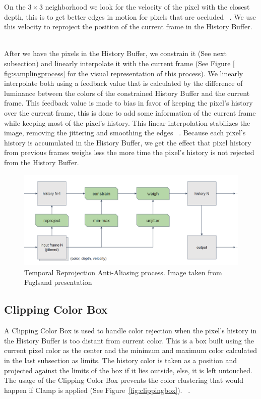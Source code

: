 \documentclass{cslthse-msc}
\begin{document}
On the $3\times 3$ neighborhood we look for the velocity of the pixel with the closest depth, this is to get better edges in motion for pixels that are occluded ~\cite{Fuglsand2016}. We use this velocity to reproject the position of the current frame in the History Buffer. ~\cite{Fuglsand2016,XU2016}

After we have the pixels in the History Buffer, we constrain it (See next subsection) and linearly interpolate it with the current frame (See Figure \ref{ fig:samplingprocess} for the visual representation of this process). We linearly interpolate both using a feedback value that is calculated by the difference of luminance between the colors of the constrained History Buffer and the current frame. This feedback value is made to bias in favor of keeping the pixel’s history over the current frame, this is done to add some information of the current frame while keeping most of the pixel's history. This linear interpolation stabilizes the image, removing the jittering and smoothing the edges ~\cite{Fuglsand2016,XU2016}. Because each pixel's history is accumulated in the History Buffer, we get the effect that pixel history from previous frames weighs less the more time the pixel's history is not rejected from the History Buffer. ~\cite{Fuglsand2016}

\begin{figure}[!hbt]
	\centering
	\includegraphics[scale=0.4]{images/sampling_process.png}
	\caption{Temporal Reprojection Anti-Aliasing process. Image taken from Fuglsand presentation \protect\cite{Fuglsand2016}}\label{fig:samplingprocess}
\end{figure}

\subsection{Clipping Color Box} 
A Clipping Color Box is used to handle color rejection when the pixel's history in the History Buffer is too distant from current color. This is a box built using the current pixel color as the center and the minimum and maximum color calculated in the last subsection as limits. The history color is taken as a position and projected against the limits of the box if it lies outside, else, it is left untouched. The usage of the Clipping Color Box prevents the color clustering that would happen if Clamp is applied (See Figure~\ref{fig:clippingbox}). ~\cite{Fuglsand2016}.
\end{document}
